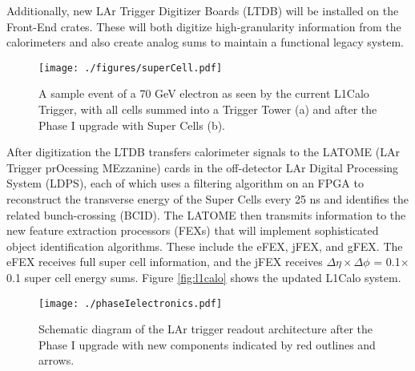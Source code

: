 Additionally, new LAr Trigger Digitizer Boards (LTDB) will be installed on the Front-End crates.  These will both digitize high-granularity information from the calorimeters and also create analog sums to maintain a functional legacy system.  \\

\begin{figure}[h!]
  \centering
	\texttt{[image: ./figures/superCell.pdf]}
\caption{\label{fig:superCell}{ A sample event of a 70 GeV electron as seen by the current L1Calo Trigger, with all cells summed into a Trigger Tower (a) and after the Phase I upgrade with Super Cells (b)\cite{LArPhaseITDR}. }} %
\end{figure}


After digitization the LTDB transfers calorimeter signals to the LATOME (LAr Trigger prOcessing MEzzanine) cards in the off-detector LAr Digital Processing System (LDPS), each of which uses a filtering algorithm on an FPGA to reconstruct the transverse energy of the Super Cells every 25 ns and identifies the related bunch-crossing (BCID).  The LATOME then transmits information to the new feature extraction processors (FEXs) that will implement sophisticated object identification algorithms.  These include the eFEX, jFEX, and gFEX.  The eFEX receives full super cell information, and the jFEX receives $\Delta\eta \times \Delta\phi$ = 0.1$\times$0.1 super cell energy sums. Figure \ref{fig:l1calo} shows the updated L1Calo system.  \\%

\begin{figure}[h!]
  \centering
	\texttt{[image: ./phaseIelectronics.pdf]}
\caption{\label{fig:phaseIelec}{ Schematic diagram of the LAr trigger readout architecture after the Phase I upgrade with new components indicated by red outlines and arrows\cite{LArPhaseITDR}. }} %
\end{figure}

